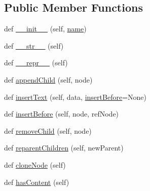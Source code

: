 \subsection*{Public Member Functions}
\begin{DoxyCompactItemize}
\item 
def \hyperlink{classpip_1_1__vendor_1_1html5lib_1_1treebuilders_1_1base_1_1Node_a9f688f4137f5f849e309ff56dfb7c307}{\+\_\+\+\_\+init\+\_\+\+\_\+} (self, \hyperlink{classpip_1_1__vendor_1_1html5lib_1_1treebuilders_1_1base_1_1Node_aaf5f466807c04fcc29523ace66986cb0}{name})
\item 
def \hyperlink{classpip_1_1__vendor_1_1html5lib_1_1treebuilders_1_1base_1_1Node_a4795f917926590b9f31be92fc914775c}{\+\_\+\+\_\+str\+\_\+\+\_\+} (self)
\item 
def \hyperlink{classpip_1_1__vendor_1_1html5lib_1_1treebuilders_1_1base_1_1Node_acb818087a568dedd5d2a38bc3597dcac}{\+\_\+\+\_\+repr\+\_\+\+\_\+} (self)
\item 
def \hyperlink{classpip_1_1__vendor_1_1html5lib_1_1treebuilders_1_1base_1_1Node_a8efc351de3913937ad476ac77ff5ee06}{append\+Child} (self, node)
\item 
def \hyperlink{classpip_1_1__vendor_1_1html5lib_1_1treebuilders_1_1base_1_1Node_a97a4896f9c91d1d5fdf5634c7696e612}{insert\+Text} (self, data, \hyperlink{classpip_1_1__vendor_1_1html5lib_1_1treebuilders_1_1base_1_1Node_a29203f0cdff82b16ae8b6ffe3db00aea}{insert\+Before}=None)
\item 
def \hyperlink{classpip_1_1__vendor_1_1html5lib_1_1treebuilders_1_1base_1_1Node_a29203f0cdff82b16ae8b6ffe3db00aea}{insert\+Before} (self, node, ref\+Node)
\item 
def \hyperlink{classpip_1_1__vendor_1_1html5lib_1_1treebuilders_1_1base_1_1Node_adcd70997c9a6bf95d73986dd7f0e61b3}{remove\+Child} (self, node)
\item 
def \hyperlink{classpip_1_1__vendor_1_1html5lib_1_1treebuilders_1_1base_1_1Node_af18caaac6d2663b56dd8256b39711eba}{reparent\+Children} (self, new\+Parent)
\item 
def \hyperlink{classpip_1_1__vendor_1_1html5lib_1_1treebuilders_1_1base_1_1Node_a478844674ed05858246f008931d88a46}{clone\+Node} (self)
\item 
def \hyperlink{classpip_1_1__vendor_1_1html5lib_1_1treebuilders_1_1base_1_1Node_a543627011a8eb387cb95afcb37016d57}{has\+Content} (self)
\end{DoxyCompactItemize}
